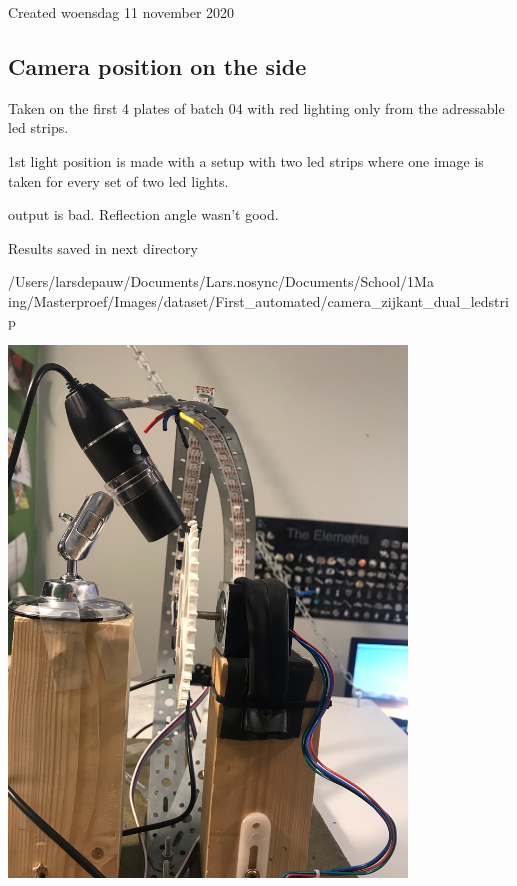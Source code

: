 \documentclass{article}
\begin{document}
Created woensdag 11 november 2020



\subsection{Camera position on the side}

Taken on the first 4 plates of batch 04 with red lighting only from the adressable led strips. 



1st light position is made with a setup with two led strips where one image is taken for every set of two led lights. 

output is bad. Reflection angle wasn't good. 

Results saved in next directory

/Users/larsdepauw/Documents/Lars.nosync/Documents/School/1Ma ing/Masterproef/Images/dataset/First\_automated/camera\_zijkant\_dual\_ledstrip



\includegraphics[width=4.166667in, keepaspectratio=true]{./ZimFiles_files/Vision/Dataset/automated_datasets/1_check_camera_position/1_camera_position_side/achter2.jpeg}
\end{document}
